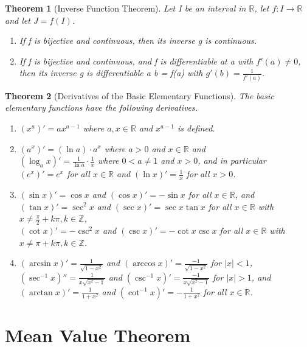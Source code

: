 \documentclass[11pt, oneside]{book}
\theoremstyle{break}
\newtheorem{thm}{Theorem}[section]
\newcommand{\bb}[1]{\mathbb{#1}}			%
\begin{document}
\begin{thm}[Inverse Function Theorem]
	Let I be an interval in $\bb{R}$, let $f: I \to \bb{R}$ and let $J = f(I)$.
	\begin{enumerate}
		\item If f is bijective and continuous, then its inverse g is continuous.
		\item If f is bijective and continuous, and f is differentiable at a with $f'(a) \neq 0$, then its inverse g is differentiable a b = f(a) with $g'(b) = \frac{1}{f'(a)}$.
	\end{enumerate}
\end{thm}

\begin{thm}[Derivatives of the Basic Elementary Functions]
	The basic elementary functions have the following derivatives.
	\begin{enumerate}
		\item $(x^a)' = a x^{a-1}$ where $a, x \in \bb{R}$ and $x^{a - 1}$ is defined.
		\item $(a^x)' = (\ln a) \cdot a^x$ where $a > 0$ and $x \in \bb{R}$ and \\
		 	  $(\log_a x)' = \frac{1}{\ln a} \cdot \frac{1}{x}$ where $0 < a \neq 1$ and $x > 0$, and in particular \\
		 	  $(e^x)' = e^x$ for all $x \in \bb{R}$ and $(\ln x)' = \frac{1}{x}$ for all $x > 0$.
		\item $(\sin x)' = \cos x$ and $(\cos x)' = -\sin x$ for all $x \in \bb{R}$, and \\
			  $(\tan x)' = \sec^2 x$ and $(\sec x)' = \sec x \tan x$ for all $x \in \bb{R}$ with $x \neq \frac{\pi}{2} + k\pi, k \in \bb{Z}$,\\
			  $(\cot x)' = -\csc^2 x$ and $(\csc x)' = -\cot x \csc x$ for all $x \in \bb{R}$ with $x \neq \pi + k \pi, k \in \bb{Z}$.
		\item $(\arcsin x)' = \frac{1}{\sqrt{1 - x^2}}$ and $(\arccos x)' = \frac{-1}{\sqrt{1 - x^2}}$ for $|x| < 1$, \\
			  $(\sec^{-1} x)'' = \frac{1}{x \sqrt{x^2 - 1}}$ and $(\csc^{-1} x)' = \frac{-1}{x \sqrt{x^2 - 1}}$ for $|x| > 1$, and \\
			  $(\arctan x)' = \frac{1}{1 + x^2}$ and $(\cot^{-1} x)' = -\frac{1}{1 + x^2}$ for all $x \in \bb{R}$.
	\end{enumerate}
\end{thm}


\section{Mean Value Theorem}
\end{document}
